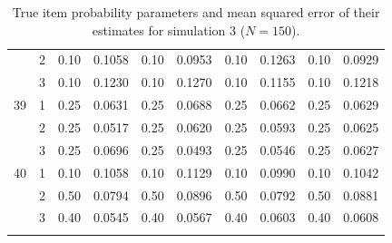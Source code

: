 \begin{longtable}{llcccccccc}
   & 2 & 0.10 & 0.1058 & 0.10 & 0.0953 & 0.10 & 0.1263 & 0.10 & 0.0929 \\ 
   & 3 & 0.10 & 0.1230 & 0.10 & 0.1270 & 0.10 & 0.1155 & 0.10 & 0.1218 \\ 
  39 & 1 & 0.25 & 0.0631 & 0.25 & 0.0688 & 0.25 & 0.0662 & 0.25 & 0.0629 \\ 
   & 2 & 0.25 & 0.0517 & 0.25 & 0.0620 & 0.25 & 0.0593 & 0.25 & 0.0625 \\ 
   & 3 & 0.25 & 0.0696 & 0.25 & 0.0493 & 0.25 & 0.0546 & 0.25 & 0.0627 \\ 
  40 & 1 & 0.10 & 0.1058 & 0.10 & 0.1129 & 0.10 & 0.0990 & 0.10 & 0.1042 \\ 
   & 2 & 0.50 & 0.0794 & 0.50 & 0.0896 & 0.50 & 0.0792 & 0.50 & 0.0881 \\ 
   & 3 & 0.40 & 0.0545 & 0.40 & 0.0567 & 0.40 & 0.0603 & 0.40 & 0.0608 \\ 
   \bottomrule
\caption{True item probability parameters and mean squared error of their estimates for simulation 3 ($N = 150$).} 
\label{table:sim3_item_prob_mse_N150}
\end{longtable}
